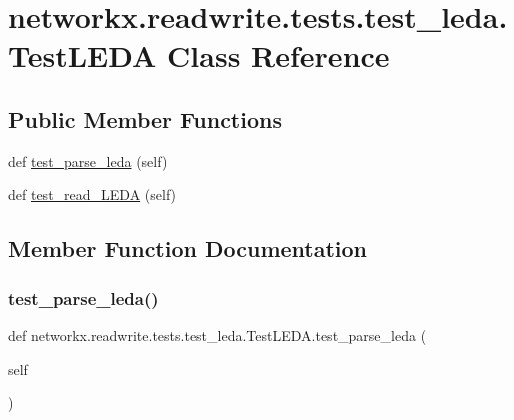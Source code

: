 \hypertarget{classnetworkx_1_1readwrite_1_1tests_1_1test__leda_1_1TestLEDA}{}\section{networkx.\+readwrite.\+tests.\+test\+\_\+leda.\+Test\+L\+E\+DA Class Reference}
\label{classnetworkx_1_1readwrite_1_1tests_1_1test__leda_1_1TestLEDA}
\subsection*{Public Member Functions}
\begin{DoxyCompactItemize}
\item 
def \hyperlink{classnetworkx_1_1readwrite_1_1tests_1_1test__leda_1_1TestLEDA_ac16cfd4ae1ad756c2a233a2f98029c76}{test\+\_\+parse\+\_\+leda} (self)
\item 
def \hyperlink{classnetworkx_1_1readwrite_1_1tests_1_1test__leda_1_1TestLEDA_a8a21e753b7e7c5436d5edb8b282e878b}{test\+\_\+read\+\_\+\+L\+E\+DA} (self)
\end{DoxyCompactItemize}


\subsection{Member Function Documentation}
\mbox{\label{classnetworkx_1_1readwrite_1_1tests_1_1test__leda_1_1TestLEDA_ac16cfd4ae1ad756c2a233a2f98029c76}} 
\subsubsection{\texorpdfstring{test\+\_\+parse\+\_\+leda()}{test\_parse\_leda()}}
{\footnotesize\ttfamily def networkx.\+readwrite.\+tests.\+test\+\_\+leda.\+Test\+L\+E\+D\+A.\+test\+\_\+parse\+\_\+leda (\begin{DoxyParamCaption}\item[{}]{self }\end{DoxyParamCaption})}

